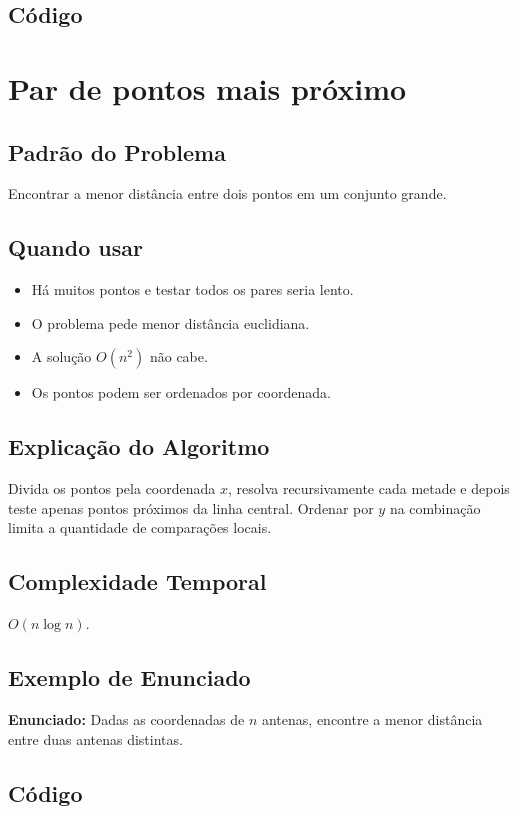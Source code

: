 \subsection{Código}

\section{Par de pontos mais próximo}

\subsection{Padrão do Problema}
Encontrar a menor distância entre dois pontos em um conjunto grande.

\subsection{Quando usar}
\begin{itemize}[nosep]
  \item Há muitos pontos e testar todos os pares seria lento.
  \item O problema pede menor distância euclidiana.
  \item A solução $O(n^2)$ não cabe.
  \item Os pontos podem ser ordenados por coordenada.
\end{itemize}

\subsection{Explicação do Algoritmo}
Divida os pontos pela coordenada $x$, resolva recursivamente cada metade e depois teste apenas pontos próximos da linha central. Ordenar por $y$ na combinação limita a quantidade de comparações locais.

\subsection{Complexidade Temporal}
$O(n \log n)$.

\subsection{Exemplo de Enunciado}
\begin{exemplodiabox}
\textbf{Enunciado:} Dadas as coordenadas de $n$ antenas, encontre a menor distância entre duas antenas distintas.
\end{exemplodiabox}

\subsection{Código}
